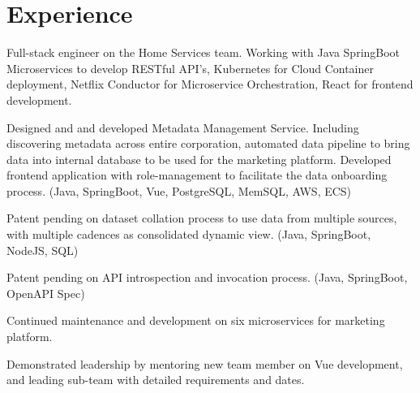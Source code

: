 \documentclass[letterpaper]{deedy-resume-openfont} %
\begin{document}
\hfill
%
%
\begin{minipage}[t]{0.7\textwidth} %


\section{Experience}


\vspace{\topsep} %

\begin{tightemize}
\item Full-stack engineer on the Home Services team. Working with Java SpringBoot Microservices to develop RESTful API's, Kubernetes for Cloud Container deployment, Netflix Conductor for Microservice Orchestration, React for frontend development. 
\end{tightemize}

\sectionsep %




\begin{tightemize}
\item Designed and and developed Metadata Management Service. Including discovering metadata across entire corporation, automated data pipeline to bring data into internal database to be used for the marketing platform. Developed frontend application with role-management to facilitate the data onboarding process. (Java, SpringBoot, Vue, PostgreSQL, MemSQL, AWS, ECS)
\item Patent pending on dataset collation process to use data from multiple sources, with multiple cadences as consolidated dynamic view. (Java, SpringBoot, NodeJS, SQL)
\item Patent pending on API introspection and invocation process. (Java, SpringBoot, OpenAPI Spec)
\item Continued maintenance and development on six microservices for marketing platform.
\item Demonstrated leadership by mentoring new team member on Vue development, and leading sub-team with detailed requirements and dates.
\end{tightemize}


\end{minipage}
\end{document}
